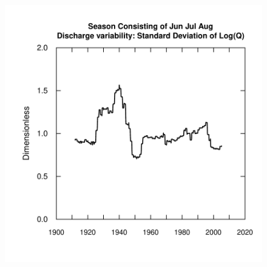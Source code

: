 \documentclass[a4paper,11pt]{article}
\begin{document}
\begin{figure}[htbp]
  \begin{minipage}[h]{0.5\linewidth}
    \begin{center}

\includegraphics{EGRET-fig3a}
    \label{fig:SDRed1}
    \end{center}
  \end{minipage}
  \hspace{0.5cm}
  \begin{minipage}[h]{0.5\linewidth}
    \begin{center}



\end{center}
\end{minipage}
\end{figure}
\end{document}
